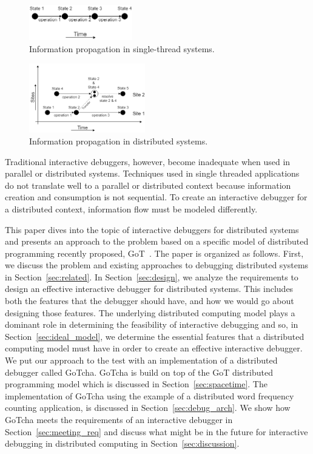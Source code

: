 \begin{figure}
\centering
\includegraphics[width=0.4\textwidth]{images/single_t.png}
\caption{Information propagation in single-thread systems.}
\label{fig:single_thread}
\end{figure}

\begin{figure}
\centering
\includegraphics[width=0.45\textwidth]{images/distributed_t.png}
\caption{Information propagation in distributed systems.}
\label{fig:distributed}
\end{figure}

Traditional interactive debuggers, however, become inadequate when used in parallel or distributed systems. Techniques used in single threaded applications do not translate well to a parallel or distributed context because information creation and consumption is not sequential. To create an interactive debugger for a distributed context, information flow must be modeled differently.

This paper dives into the topic of interactive debuggers for distributed systems and presents an approach to the problem based on a specific model of distributed programming recently proposed, GoT~\cite{got}. The paper is organized as follows. First, we discuss the problem and existing approaches to debugging distributed systems in Section~\ref{sec:related}. In Section~\ref{sec:design}, we analyze the requirements to design an effective interactive debugger for distributed systems. This includes both the features that the debugger should have, and how we would go about designing those features. The underlying distributed computing model plays a dominant role in determining the feasibility of interactive debugging and so, in Section~\ref{sec:ideal_model}, we determine the essential features that a distributed computing model must have in order to create an effective interactive debugger. We put our approach to the test with an implementation of a distributed debugger called GoTcha. GoTcha is build on top of the GoT distributed programming model which is discussed in Section~\ref{sec:spacetime}. The implementation of GoTcha using the example of a distributed word frequency counting application, is discussed in Section~\ref{sec:debug_arch}. We show how GoTcha meets the requirements of an interactive debugger in Section~\ref{sec:meeting_req} and discuss what might be in the future for interactive debugging in distributed computing in Section~\ref{sec:discussion}.